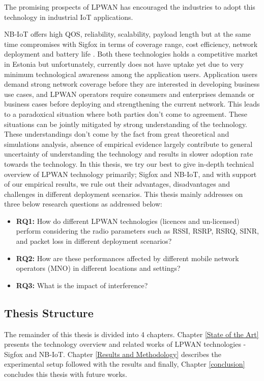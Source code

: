 \documentclass[12pt]{article}
\begin{document}
The promising prospects of LPWAN has encouraged the industries to adopt this technology in industrial IoT applications. \par
NB-IoT offers high QOS, reliability, scalability, payload length but at the same time compromises with Sigfox in terms of coverage range, cost efficiency, network deployment and battery life \cite{mekki2019comparative}. Both these technologies holds a competitive market in Estonia but unfortunately, currently does not have uptake yet due to very minimum technological awareness among the application users. Application users demand strong network coverage before they are interested in developing business use cases, and LPWAN operators require consumers and enterprises demands or business cases before deploying and strengthening the current network. This leads to a paradoxical situation where both parties don't come to agreement. These situations can be jointly mitigated by strong understanding of the technology. These understandings don't come by the fact from great theoretical and simulations analysis, absence of empirical evidence largely contribute to general uncertainty of understanding the technology and results in slower adoption rate towards the technology. In this thesis, we try our best to give in-depth technical overview of LPWAN technology primarily; Sigfox and NB-IoT, and with support of our empirical results, we rule out their advantages, disadvantages and challenges in different deployment scenarios. This thesis mainly addresses on three below research questions as addressed below:
\begin{itemize}
   \item \textbf{RQ1:} How do different LPWAN technologies (licences and un-licensed) perform considering the radio parameters such as RSSI, RSRP, RSRQ, SINR, and packet loss in different deployment scenarios?
\item \textbf{RQ2:} How are these performances affected by different mobile network operators (MNO) in different locations and settings?

\item \textbf{RQ3:} What is the impact of interference? 
   \end{itemize}

\subsection{Thesis Structure}
The remainder of this thesis is divided into 4 chapters. Chapter \ref{State of the Art} presents the technology overview and related works of LPWAN technologies - Sigfox and NB-IoT. Chapter \ref{Results and Methodology} describes the experimental setup followed with the results and finally, Chapter \ref{conclusion} concludes this thesis with future works.
\end{document}

